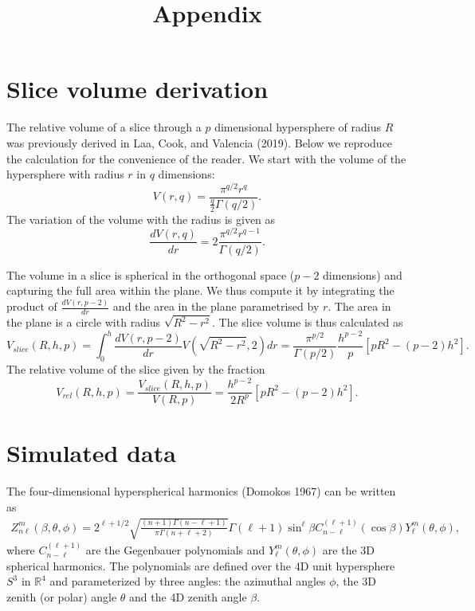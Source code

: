 \documentclass[
]{article}
\title{Appendix}
\author{}
\date{\vspace{-2.5em}}
\begin{document}
\maketitle

\hypertarget{slice-volume-derivation}{%
\section{Slice volume derivation}\label{slice-volume-derivation}}

The relative volume of a slice through a \(p\) dimensional hypersphere
of radius \(R\) was previously derived in Laa, Cook, and Valencia
(2019). Below we reproduce the calculation for the convenience of the
reader. We start with the volume of the hypersphere with radius \(r\) in
\(q\) dimensions: \begin{equation}
V(r, q) = \frac{\pi^{q/2} r^q}{\frac{q}{2} \Gamma(q/2)}.
\end{equation} The variation of the volume with the radius is given as
\begin{equation}
\frac{dV(r, q)}{dr} = 2 \frac{\pi^{q/2} r^{q-1}}{\Gamma(q/2)}.
\end{equation}

The volume in a slice is spherical in the orthogonal space (\(p-2\)
dimensions) and capturing the full area within the plane. We thus
compute it by integrating the product of \(\frac{dV(r, p-2)}{dr}\) and
the area in the plane parametrised by \(r\). The area in the plane is a
circle with radius \(\sqrt{R^2 - r^2}\). The slice volume is thus
calculated as \begin{equation}
V_{slice}(R, h, p) =
\int_0^h \frac{dV(r, p-2)}{dr} V(\sqrt{R^2 - r^2}, 2) dr =
\frac{\pi^{p/2}}{\Gamma(p/2)} \frac{h^{p-2}}{p} [pR^2 - (p-2)h^2].
\end{equation} The relative volume of the slice given by the fraction
\begin{equation}
V_{rel}(R, h, p) = \frac{V_{slice}(R, h, p)}{V(R, p)} = \frac{h^{p-2}}{2R^p} [pR^2 - (p-2)h^2].
\end{equation}

\hypertarget{simulated-data}{%
\section{Simulated data}\label{simulated-data}}

The four-dimensional hyperspherical harmonics (Domokos 1967) can be
written as \begin{eqnarray}
Z^m_{n\ell}(\beta,\theta,\phi)=2^{\ell+1/2}\sqrt{\frac{(n+1)\Gamma(n-\ell+1)}{\pi\Gamma(n+\ell+2)}}
\Gamma(\ell+1)\sin^\ell\beta C^{(\ell+1)}_{n-\ell}(\cos\beta)Y^m_\ell(\theta,\phi),
\end{eqnarray} where \(C^{(\ell+1)}_{n-\ell}\) are the Gegenbauer
polynomials and \(Y^m_\ell(\theta,\phi)\) are the 3D spherical
harmonics. The polynomials are defined over the 4D unit hypersphere
\(S^3\) in \(\mathbb{R}^4\) and parameterized by three angles: the
azimuthal angles \(\phi\), the 3D zenith (or polar) angle \(\theta\) and
the 4D zenith angle \(\beta\).
\end{document}
